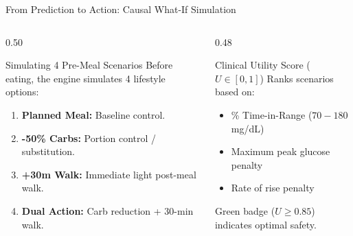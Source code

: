 \documentclass[aspectratio=169, 10pt]{beamer}
\begin{document}
\begin{frame}{From Prediction to Action: Causal What-If Simulation}
  \begin{columns}[c]
    \begin{column}{0.50\textwidth}
      \begin{block}{Simulating 4 Pre-Meal Scenarios}
        Before eating, the engine simulates 4 lifestyle options:
        \begin{enumerate}\setlength{\itemsep}{0.3em}
          \item \textbf{Planned Meal:} Baseline control.
          \item \textbf{-50\% Carbs:} Portion control / substitution.
          \item \textbf{+30m Walk:} Immediate light post-meal walk.
          \item \textbf{Dual Action:} Carb reduction + 30-min walk.
        \end{enumerate}
      \end{block}
    \end{column}
    
    \begin{column}{0.48\textwidth}
      \begin{exampleblock}{Clinical Utility Score ($U \in [0, 1]$)}
        Ranks scenarios based on:
        \begin{itemize}\setlength{\itemsep}{0.3em}
          \item \% Time-in-Range ($70 - 180$ mg/dL)
          \item Maximum peak glucose penalty
          \item Rate of rise penalty
        \end{itemize}
        {\footnotesize Green badge ($U \ge 0.85$) indicates optimal safety.}
      \end{exampleblock}
    \end{column}
  \end{columns}
\end{frame}
\end{document}
